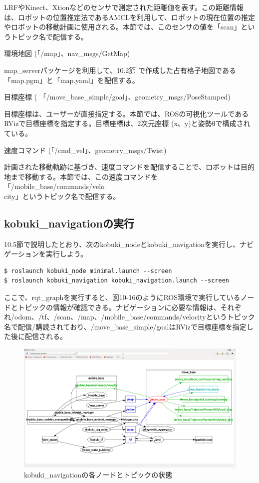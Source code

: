 LRFやKinect、Xtionなどのセンサで測定された距離値を表す。この距離情報は、ロボットの位置推定法であるAMCLを利用して、ロボットの現在位置の推定やロボットの移動計画に使用される。本節では、このセンサの値を「scan」というトピック名で配信する。

\circled{\thenum} 環境地図 (「/map」、nav\_msgs/GetMap)

map\_serverパッケージを利用して、10.2節  で作成した占有格子地図である「map.pgm」と「map.yaml」を配信する。

\circled{\thenum} 目標座標 ( 「/move\_base\_simple/goal」、geometry\_msgs/PoseStamped)

目標座標は、ユーザーが直接指定する。本節では、ROSの可視化ツールであるRVizで目標座標を指定する。目標座標は、2次元座標 (x、y)と姿勢θで構成されている。

\circled{\thenum} 速度コマンド (「/cmd\_vel」、geometry\_msgs/Twist)

計画された移動軌跡に基づき、速度コマンドを配信することで、ロボットは目的地まで移動する。本節では、この速度コマンドを「/mobile\_base/commands/velo\\city」というトピック名で配信する。

\subsection{kobuki\_navigationの実行}

10.5節で説明したとおり、次のkobuki\_nodeとkobuki\_navigationを実行し、ナビゲーションを実行しよう。

\begin{lstlisting}[language=ROS]
$ roslaunch kobuki_node minimal.launch --screen
$ roslaunch kobuki_navigation kobuki_navigation.launch --screen
\end{lstlisting}

ここで、rqt\_graphを実行すると、図10-16のようにROS環境で実行しているノードとトピックの情報が確認できる。ナビゲーションに必要な情報は、それぞれ/odom、/tf、/scan、/map、/mobile\_base/commands/velocityというトピック名で配信/購読されており、/move\_base\_simple/goalはRVizで目標座標を指定した後に配信される。

\begin{figure}[htp]
  \centering
  \includegraphics[width=15cm]{pictures/chapter10/pic_10_16.png}
  \caption{kobuki\_navigationの各ノードとトピックの状態}
\end{figure}

